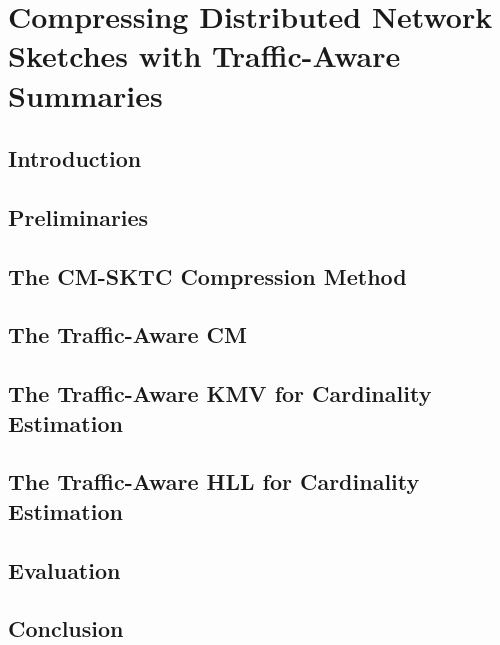 \chapter{Compressing Distributed Network Sketches with  Traffic-Aware Summaries}
\label{chap:sktc}

\section{Introduction}\label{sktc-sec:intro}


\section{Preliminaries} \label{sktc-sec:background}


\section{The CM-SKTC Compression Method}\label{sktc-sec:com-sketch}


\section{The Traffic-Aware CM}\label{sktc-sec:resize}


\section{The Traffic-Aware KMV for Cardinality Estimation}\label{sktc-sec:kmv-sktc}


\section{The Traffic-Aware HLL for Cardinality Estimation}\label{sktc-sec:hll}


\section{Evaluation}\label{sktc-sec:evaluation}


\section{Conclusion}\label{sktc-sec:conclusion}


